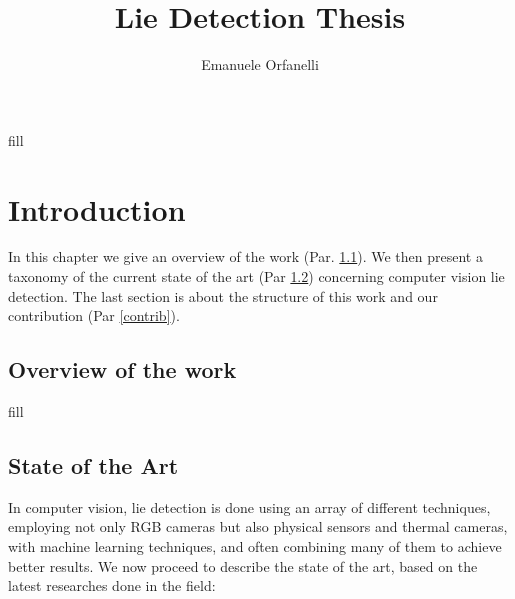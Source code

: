 \documentclass[LaM,binding=0.6cm,english,noexaminfo]{sapthesis}
\title{Lie Detection Thesis}
\author{Emanuele Orfanelli}
\begin{document}
\frontmatter

\maketitle

\dedication{Dedicated to\\ my Family and Friends}

\begin{acknowledgments}
fill
\end{acknowledgments}

\tableofcontents



\mainmatter

\chapter{Introduction}
In this chapter we give an overview of the work (Par. \ref{overview}). We then present a taxonomy of the current state of the art (Par \ref{sota}) concerning computer vision lie detection. The last section is about the structure of this work and our contribution (Par \ref{contrib}).

\pagebreak

\section{Overview of the work} \label{overview}
fill

\pagebreak

\section{State of the Art} \label{sota}
In computer vision, lie detection is done using an array of different techniques, employing not only RGB cameras but also physical sensors and thermal cameras, with machine learning techniques, and often combining many of them to achieve better results. We now proceed to describe the state of the art, based on the latest researches done in the field:
\end{document}
